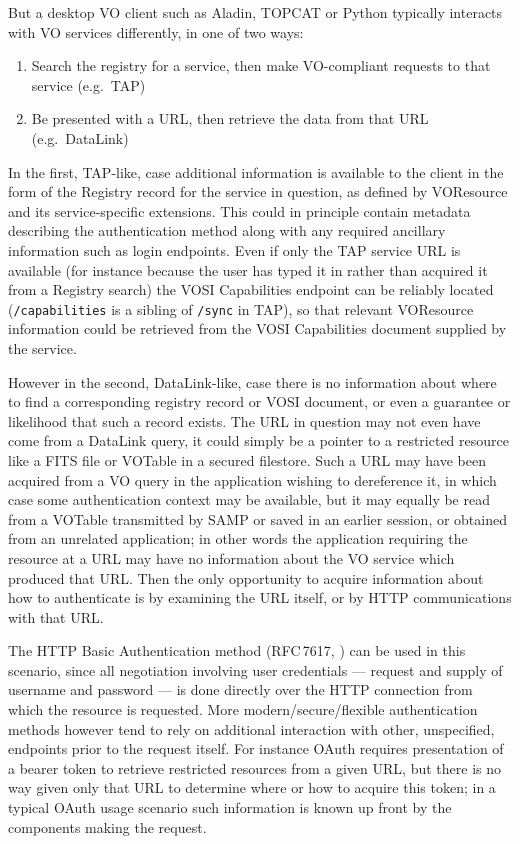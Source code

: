 \documentclass[11pt,a4paper]{ivoa}
\newcommand{\rfc}[1]{RFC\,#1}
\begin{document}
But a desktop VO client such as Aladin, TOPCAT or Python
typically interacts with VO services differently, in one of two
ways:
\begin{enumerate}
\item Search the registry for a service, then make VO-compliant
      requests to that service (e.g.\ TAP)
\item Be presented with a URL, then retrieve the data from that URL
      (e.g.\ DataLink)
\end{enumerate}
In the first, TAP-like, case additional information is available to the
client in the form of the Registry record for the service in question,
as defined by VOResource \citep{2008ivoa.spec.0222P}
and its service-specific extensions.
This could in principle contain metadata describing the authentication
method along with any required ancillary information such as
login endpoints.
Even if only the TAP service URL is available
(for instance because the user has typed it in rather than acquired it
from a Registry search) the VOSI Capabilities endpoint can be reliably
located ({\tt /capabilities} is a sibling of {\tt /sync} in TAP),
so that relevant VOResource information could be retrieved from the VOSI
Capabilities document supplied by the service.

However in the second, DataLink-like, case
there is no information about where to find a corresponding
registry record or VOSI document,
or even a guarantee or likelihood that such a record exists.
The URL in question may not even have come from a DataLink query,
it could simply be a pointer to a restricted resource like a
FITS file or VOTable in a secured filestore.
Such a URL may have been acquired from a VO query in the application
wishing to dereference it, in which case some authentication context
may be available,
but it may equally be read from a VOTable transmitted by SAMP
or saved in an earlier session, or obtained from an unrelated application;
in other words the application requiring the resource at a URL may
have no information about the VO service which produced that URL.
Then the only opportunity to acquire information about how to authenticate
is by examining the URL itself, or by HTTP communications with that URL.

The HTTP Basic Authentication method (\rfc{7617}, \citet{std:RFC7617})
can be used in this scenario,
since all negotiation involving user credentials ---
request and supply of username and password ---
is done directly
over the HTTP connection from which the resource is requested.
More modern/secure/flexible authentication methods however tend to
rely on additional interaction with other, unspecified, endpoints
prior to the request itself.  For instance OAuth requires presentation
of a bearer token to retrieve restricted resources from a given URL,
but there is no way given only that URL to determine where or how
to acquire this token;
in a typical OAuth usage scenario such information is known up front
by the components making the request.
\end{document}

